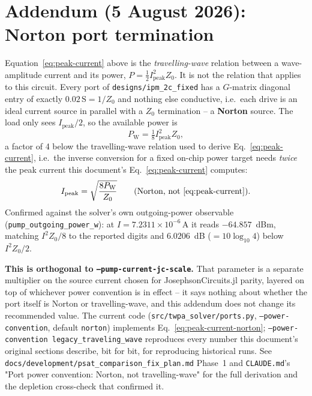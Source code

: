 \documentclass[11pt,a4paper]{article}
\begin{document}
\section*{Addendum (5 August 2026): Norton port termination}

Equation~\eqref{eq:peak-current} above is the \emph{travelling-wave} relation
between a wave-amplitude current and its power, $P=\tfrac12 I_{\mathrm{peak}}^2Z_0$.
It is not the relation that applies to this circuit. Every port of
\texttt{designs/ipm\_2c\_fixed} has a $G$-matrix diagonal entry of exactly
$0.02\,\mathrm S=1/Z_0$ and nothing else conductive, i.e.\ each drive is an
ideal current source in parallel with a $Z_0$ termination -- a
\textbf{Norton} source. The load only sees $I_{\mathrm{peak}}/2$, so the
available power is
\begin{equation}
  P_{\mathrm W}=\tfrac18 I_{\mathrm{peak}}^2 Z_0,
  \label{eq:peak-current-norton}
\end{equation}
a factor of 4 below the travelling-wave relation used to derive
Eq.~\eqref{eq:peak-current}, i.e.\ the inverse
conversion for a fixed on-chip power target needs
\emph{twice} the peak current this document's Eq.~\eqref{eq:peak-current}
computes:
\begin{equation}
  I_{\mathrm{peak}}=\sqrt{\frac{8P_{\mathrm W}}{Z_0}}
  \qquad\text{(Norton, not \eqref{eq:peak-current})}.
\end{equation}
Confirmed against the solver's own outgoing-power observable
(\texttt{pump\_outgoing\_power\_w}): at $I=7.2311\times10^{-6}\,\mathrm A$ it
reads $-64.857$~dBm, matching $I^2Z_0/8$ to the reported digits and
$6.0206$~dB ($=10\log_{10}4$) below $I^2Z_0/2$.

\textbf{This is orthogonal to \texttt{--pump-current-jc-scale}.} That
parameter is a separate multiplier on the source current chosen for
JosephsonCircuits.jl parity, layered on top of whichever power convention is
in effect -- it says nothing about whether the port itself is Norton or
travelling-wave, and this addendum does not change its recommended value.
The current code (\texttt{src/twpa\_solver/ports.py},
\texttt{--power-convention}, default \texttt{norton}) implements
Eq.~\eqref{eq:peak-current-norton}; \texttt{--power-convention
legacy\_traveling\_wave} reproduces every number this document's original
sections describe, bit for bit, for reproducing historical runs. See
\texttt{docs/development/psat\_comparison\_fix\_plan.md} Phase~1 and
\texttt{CLAUDE.md}'s "Port power convention: Norton, not travelling-wave" for
the full derivation and the depletion cross-check that confirmed it.
\end{document}

